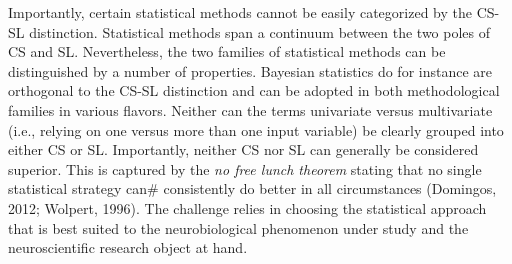 \documentclass[authoryear,review,3p]{elsarticle}
\begin{document}
Importantly, certain statistical
methods cannot be easily categorized by the CS-SL distinction.
Statistical methods span a continuum between the two poles of CS and SL.
Nevertheless, the two families of statistical methods can be distinguished by a number of properties.
Bayesian statistics do for instance are orthogonal to the CS-SL distinction
and can be adopted in both methodological families in various flavors.
Neither can the terms univariate versus multivariate
(i.e., relying on one versus more than one input variable)
be clearly grouped into either CS or SL.
%
Importantly, neither CS nor SL can generally be considered superior.
This is captured by the \textit{no free lunch theorem}
stating that no single statistical strategy can#
consistently do better in all circumstances (Domingos, 2012; Wolpert, 1996).
The challenge relies in choosing
the statistical approach that is best suited
to the neurobiological phenomenon under study and the neuroscientific research object at hand.
\end{document}

